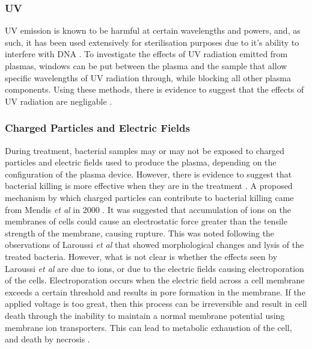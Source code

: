 \documentclass[11pt, oneside]{article}   	%
\begin{document}
\subsubsection{UV}
UV emission is known to be harmful at certain wavelengths and powers, and, as such, it has been used extensively for sterilisation purposes due to it's ability to interfere with DNA \cite{Laroussi2004evaluation}.
To investigate the effects of UV radiation emitted from plasmas, windows can be put between the plasma and the sample that allow specific wavelengths of UV radiation through, while blocking all other plasma components. 
Using these methods, there is evidence to suggest that the effects of UV radiation are negligable \cite{Laroussi2004evaluation, Dobrynin2009physical}.

\subsubsection{Charged Particles and Electric Fields}
During treatment, bacterial samples may or may not be exposed to charged particles and electric fields used to produce the plasma, depending on the configuration of the plasma device.
However, there is evidence to suggest that bacterial killing is more effective when they are in the treatment \cite{Fridman2007comparison}.
A proposed mechanism by which charged particles can contribute to bacterial killing came from Mendis \textit{et al} in 2000 \cite{Mendis2000a}.
It was suggested that accumulation of ions on the membranes of cells could cause an electrostatic force greater than the tensile strength of the membrane, causing rupture.
This was noted following the observations of Laroussi \textit{et al} \cite{Laroussi1999images} that showed morphological changes and lysis of the treated bacteria.
However, what is not clear is whether the effects seen by Laroussi \textit{et al} are due to ions, or due to the electric fields causing electroporation of the cells.
Electroporation occurs when the electric field across a cell membrane exceeds a certain threshold and results in pore formation in the membrane. If the applied voltage is too great, then this process can be irreversible and result in cell death through the inability to maintain a normal membrane potential using membrane ion transporters. 
This can lead to metabolic exhaustion of the cell, and death by necrosis \cite{Lee2006cell}.
\end{document}
